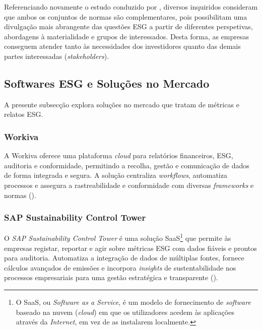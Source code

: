 Referenciando novamente o estudo conduzido por \cite{GRISASB2021}, diversos inquiridos consideram que ambos os conjuntos de normas são complementares, pois possibilitam uma divulgação mais abrangente das questões ESG a partir de diferentes perspetivas, abordagens à materialidade e grupos de interessados. Desta forma, as empresas conseguem atender tanto às necessidades dos investidores quanto das demais partes interessadas (\textit{stakeholders}).


\subsection{Softwares ESG e Soluções no Mercado}
\label{subsec: SESGSM}

A presente subsecção explora soluções no mercado que tratam de métricas e relatos ESG.

\subsubsection{Workiva}

A Workiva oferece uma plataforma \textit{cloud} para relatórios financeiros, ESG, auditoria e conformidade, permitindo a recolha, gestão e comunicação de dados de forma integrada e segura. A solução centraliza \textit{workflows}, automatiza processos e assegura a rastreabilidade e conformidade com diversas \textit{frameworks} e normas (\cite{Workiva2025}).

\subsubsection{SAP Sustainability Control Tower}

O \textit{SAP Sustainability Control Tower} é uma solução SaaS\footnote{O SaaS, ou \textit{Software as a Service}, é um modelo de fornecimento de \textit{software} baseado na nuvem (\textit{cloud}) em que os utilizadores acedem às aplicações através da \textit{Internet}, em vez de as instalarem  localmente.} que permite às empresas registar, reportar e agir sobre métricas ESG com dados fiáveis e prontos para auditoria. Automatiza a integração de dados de múltiplas fontes, fornece cálculos avançados de emissões e incorpora \textit{insights} de sustentabilidade nos processos empresariais para uma gestão estratégica e transparente (\cite{SAP2025}).

